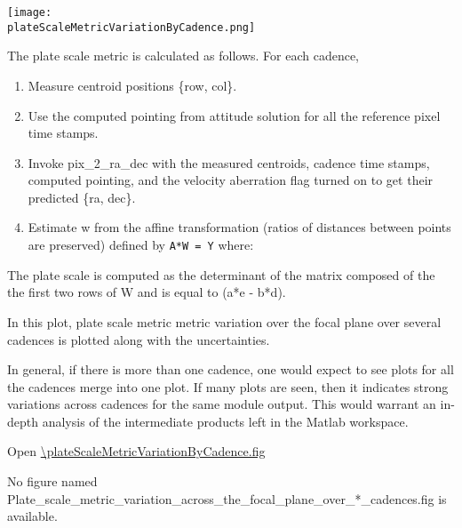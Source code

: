 \begin{center}
  \texttt{[image: \\plateScaleMetricVariationByCadence.png]}
\end{center}

The plate scale metric is calculated as follows. For each cadence, 

\begin{enumerate}
\item 
  Measure centroid positions \{row, col\}.
\item 
  Use the computed pointing from attitude solution for all the reference
  pixel time stamps.
\item 
  Invoke pix\_2\_ra\_dec with the measured centroids, cadence time
  stamps, computed pointing, and the velocity aberration flag turned on
  to get their predicted \{ra, dec\}.
\item 
  Estimate w from the affine transformation (ratios of distances between
  points are preserved) defined by \texttt{A*W = Y} where:
\end{enumerate}

The plate scale is computed as the determinant of the matrix composed
of the the first two rows of W and is equal to (a*e - b*d).

In this plot, plate scale metric metric variation over the focal plane
over several cadences is plotted along with the uncertainties.

In general, if there is more than one cadence, one would expect to see
plots for all the cadences merge into one plot. If many plots are
seen, then it indicates strong variations across cadences for the same
module output. This would warrant an in-depth analysis of the
intermediate products left in the Matlab workspace.

Open \url{\plateScaleMetricVariationByCadence.fig}

\else
No figure named
Plate\_scale\_metric\_variation\_across\_the\_focal\_plane\_over\_*\_cadences.fig
is available.
\fi
\clearpage
